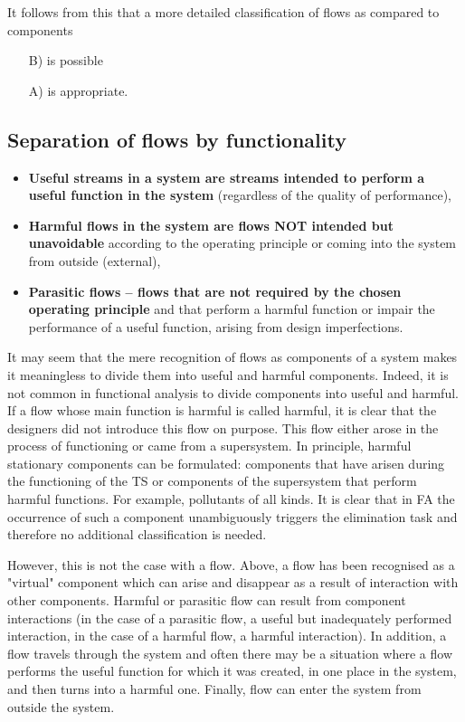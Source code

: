 \documentclass[a4paper,11pt]{article}
\begin{document}
It follows from this that a more detailed classification of flows as compared
to components
\begin{itemize}
\item[B)] is possible
\item[A)] is appropriate.
\end{itemize}

\subsection{Separation of flows by functionality}

\begin{itemize}
\item \textbf{Useful streams in a system are streams intended to perform a
  useful function in the system} (regardless of the quality of performance),
\item \textbf{Harmful flows in the system are flows NOT intended but
  unavoidable} according to the operating principle or coming into the system
  from outside (external),
\item \textbf{Parasitic flows -- flows that are not required by the chosen
  operating principle} and that perform a harmful function or impair the
  performance of a useful function, arising from design imperfections.
\end{itemize}
It may seem that the mere recognition of flows as components of a system makes
it meaningless to divide them into useful and harmful components. Indeed, it
is not common in functional analysis to divide components into useful and
harmful. If a flow whose main function is harmful is called harmful, it is
clear that the designers did not introduce this flow on purpose. This flow
either arose in the process of functioning or came from a supersystem. In
principle, harmful stationary components can be formulated: components that
have arisen during the functioning of the TS or components of the supersystem
that perform harmful functions. For example, pollutants of all kinds. It is
clear that in FA the occurrence of such a component unambiguously triggers the
elimination task and therefore no additional classification is needed.

However, this is not the case with a flow. Above, a flow has been recognised
as a "virtual" component which can arise and disappear as a result of
interaction with other components. Harmful or parasitic flow can result from
component interactions (in the case of a parasitic flow, a useful but
inadequately performed interaction, in the case of a harmful flow, a harmful
interaction). In addition, a flow travels through the system and often there
may be a situation where a flow performs the useful function for which it was
created, in one place in the system, and then turns into a harmful one.
Finally, flow can enter the system from outside the system.
\end{document}
